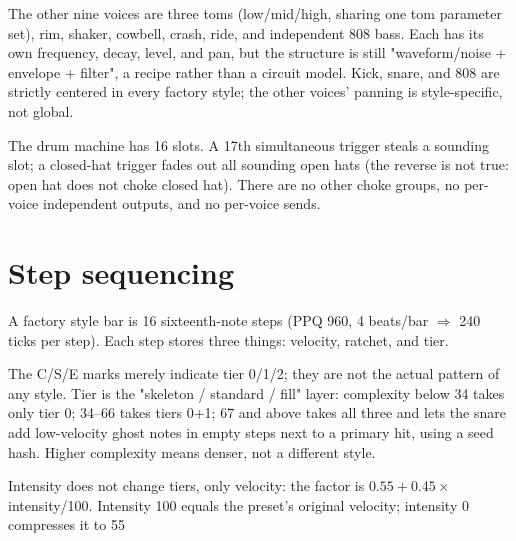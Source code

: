 The other nine voices are three toms (low/mid/high, sharing one tom parameter set), rim, shaker, cowbell, crash, ride, and independent 808 bass. Each has its own frequency, decay, level, and pan, but the structure is still "waveform/noise + envelope + filter", a recipe rather than a circuit model. Kick, snare, and 808 are strictly centered in every factory style; the other voices' panning is style-specific, not global.

The drum machine has 16 slots. A 17th simultaneous trigger steals a sounding slot; a closed-hat trigger fades out all sounding open hats (the reverse is not true: open hat does not choke closed hat). There are no other choke groups, no per-voice independent outputs, and no per-voice sends.

\section{Step sequencing}

A factory style bar is 16 sixteenth-note steps (PPQ 960, 4 beats/bar $\Rightarrow$ 240 ticks per step). Each step stores three things: velocity, ratchet, and tier.

\begin{center}
\end{center}

The C/S/E marks merely indicate tier 0/1/2; they are not the actual pattern of any style. Tier is the "skeleton / standard / fill" layer: complexity below 34 takes only tier 0; 34–66 takes tiers 0+1; 67 and above takes all three and lets the snare add low-velocity ghost notes in empty steps next to a primary hit, using a seed hash. Higher complexity means denser, not a different style.

Intensity does not change tiers, only velocity: the factor is $0.55 + 0.45 \times$ intensity/100. Intensity 100 equals the preset's original velocity; intensity 0 compresses it to 55%

